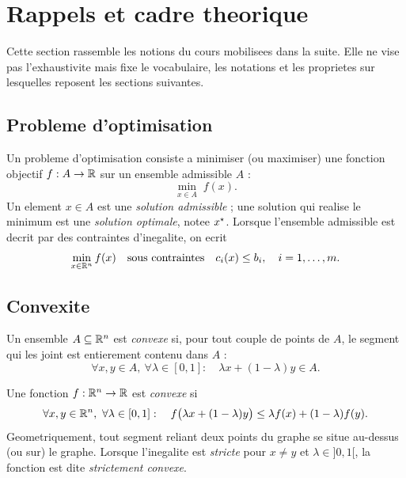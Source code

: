 \section{Rappels et cadre theorique}
\label{sec:rappels}

Cette section rassemble les notions du cours mobilisees dans la suite. Elle ne
vise pas l'exhaustivite mais fixe le vocabulaire, les notations et les
proprietes sur lesquelles reposent les sections suivantes.

\subsection{Probleme d'optimisation}

Un probleme d'optimisation consiste a minimiser (ou maximiser) une fonction
objectif $f : A \to \mathbb{R}$ sur un ensemble admissible $A$ :
\[
  \min_{x \in A} \; f(x).
\]
Un element $x \in A$ est une \emph{solution admissible} ; une solution qui
realise le minimum est une \emph{solution optimale}, notee $x^{\star}$. Lorsque
l'ensemble admissible est decrit par des contraintes d'inegalite, on ecrit
\[
  \min_{x \in \mathbb{R}^{n}} f(x)
  \quad\text{sous contraintes}\quad
  c_i(x) \le b_i, \quad i = 1, \dots, m.
\]

\subsection{Convexite}

\begin{definition}
Un ensemble $A \subseteq \mathbb{R}^{n}$ est \emph{convexe} si, pour tout couple de
points de $A$, le segment qui les joint est entierement contenu dans $A$ :
\[
  \forall x, y \in A,\ \forall \lambda \in [0,1] :\quad
  \lambda x + (1-\lambda) y \in A.
\]
\end{definition}

\begin{definition}
Une fonction $f : \mathbb{R}^{n} \to \mathbb{R}$ est \emph{convexe} si
\[
  \forall x, y \in \mathbb{R}^{n},\ \forall \lambda \in [0,1] :\quad
  f\big(\lambda x + (1-\lambda) y\big)
  \le \lambda f(x) + (1-\lambda) f(y).
\]
Geometriquement, tout segment reliant deux points du graphe se situe au-dessus
(ou sur) le graphe. Lorsque l'inegalite est \emph{stricte} pour $x \neq y$ et
$\lambda \in {]0,1[}$, la fonction est dite \emph{strictement convexe}.
\end{definition}


